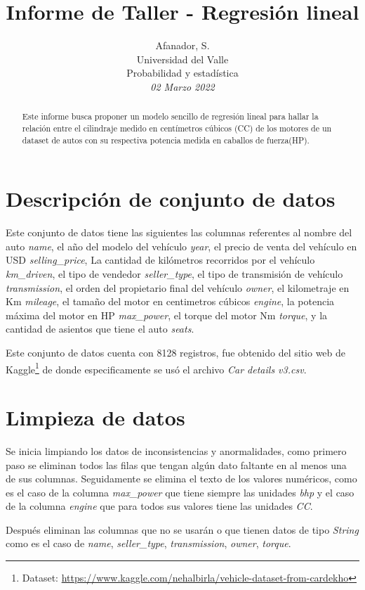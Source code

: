 \documentclass{article}
\title{Informe de Taller - Regresión lineal}
\author{Afanador, S. \\ Universidad del Valle \\ Probabilidad y estadística \\ \it{02 Marzo 2022}}
\begin{document}
\maketitle
{}
\begin{abstract}
Este informe busca proponer un modelo sencillo de regresión lineal para hallar la relación entre el cilindraje medido en centímetros cúbicos (CC) de los motores de un dataset de autos con su respectiva potencia medida en caballos de fuerza(HP).
\end{abstract}

\section{Descripción de conjunto de datos}
Este conjunto de datos tiene las siguientes las columnas referentes al nombre del auto \textit{name}, el año del modelo del vehículo \textit{year}, el precio de venta del vehículo en USD \textit{selling\_price}, La cantidad de kilómetros recorridos por el vehículo \textit{km\_driven}, el tipo de vendedor \textit{seller\_type}, el tipo de transmisión de vehículo \textit{transmission}, el orden del propietario final del vehículo \textit{owner}, el kilometraje en Km \textit{mileage}, el tamaño del motor en centimetros cúbicos \textit{engine}, la potencia máxima del motor en HP \textit{max\_power}, el torque del motor Nm \textit{torque}, y la cantidad de asientos que tiene el auto \textit{seats}.\par

Este conjunto de datos cuenta con 8128 registros, fue obtenido del sitio web de Kaggle\footnote{Dataset: \url{https://www.kaggle.com/nehalbirla/vehicle-dataset-from-cardekho}} de donde especificamente se usó el archivo \textit{Car details v3.csv}.

\section{Limpieza de datos}
Se inicia limpiando los datos de inconsistencias y anormalidades, como primero paso se eliminan todos las filas que tengan algún dato faltante en al menos una de sus columnas. Seguidamente se elimina el texto de los valores numéricos, como es el caso de la columna \textit{max\_power} que tiene siempre las unidades \textit{bhp} y el caso de la columna \textit{engine} que para todos sus valores tiene las unidades \textit{CC}.\par
Después eliminan las columnas que no se usarán o que tienen datos de tipo \textit{String} como es el caso de \textit{name}, \textit{seller\_type}, \textit{transmission}, \textit{owner}, \textit{torque}.
\end{document}
